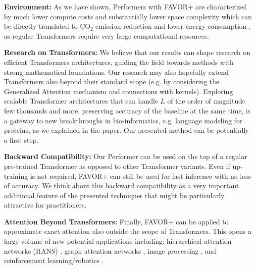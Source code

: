 \textbf{Environment:} As we have shown, Performers with FAVOR+ are characterized by much lower compute costs and substantially lower space complexity which can be directly translated to $\mathrm{CO}_{2}$ emission reduction \citep{co2} and lower energy consumption \citep{energy}, as regular Transformers require very large computational resources.

\textbf{Research on Transformers:} We believe that our results can shape research on efficient Transformers architectures, guiding the field towards methods with strong mathematical foundations. Our research may also hopefully extend Transformers also beyond their standard scope (e.g. by considering the Generalized Attention mechanism and connections with kernels). Exploring scalable Transformer architectures that can handle $L$ of the order of magnitude few thousands and more, preserving accuracy of the baseline at the same time, is a gateway to new breakthroughs in bio-informatics, e.g. language modeling for proteins, as we explained in the paper. Our presented method can be potentially a first step.

\textbf{Backward Compatibility:} Our Performer can be used on the top of a regular pre-trained Transformer as opposed to other Transformer variants. Even if up-training is not required, FAVOR+ can still be used for fast inference with no loss of accuracy. We think about this backward compatibility as a very important additional feature of the presented techniques that might be particularly attractive for practitioners.

\textbf{Attention Beyond Transformers:} Finally, FAVOR+ can be applied to approximate exact attention also outside the scope of Transformers. This opens a large volume of new potential applications including: hierarchical attention networks (HANS) \citep{hans}, graph attention networks \citep{gran}, image processing \citep{attention_cvpr}, and reinforcement learning/robotics \citep{tang}. 



